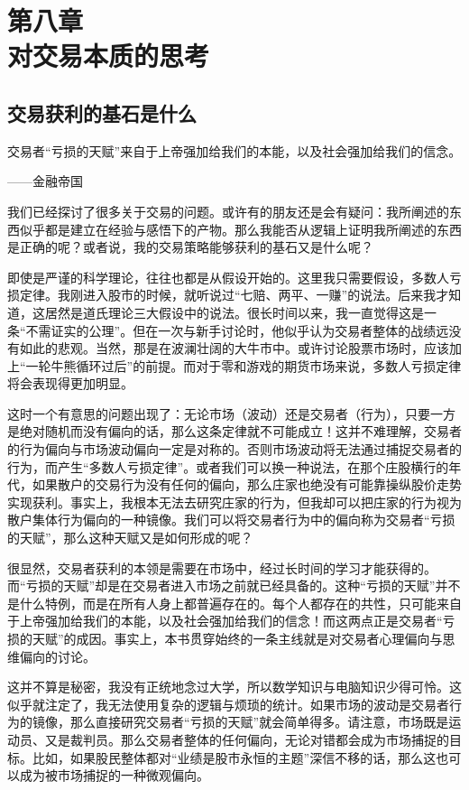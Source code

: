 \section[第八章\q 对交易本质的思考]{第八章\\ 对交易本质的思考}

\subsection{交易获利的基石是什么}

{\kaishu
交易者“亏损的天赋”来自于上帝强加给我们的本能，以及社会强加给我们的信念。

\hfill ——金融帝国
}

我们已经探讨了很多关于交易的问题。或许有的朋友还是会有疑问：我所阐述的东西似乎都是建立在经验与感悟下的产物。那么我能否从逻辑上证明我所阐述的东西是正确的呢？或者说，我的交易策略能够获利的基石又是什么呢？

即使是严谨的科学理论，往往也都是从假设开始的。这里我只需要假设，多数人亏损定律。我刚进入股市的时候，就听说过“七赔、两平、一赚”的说法。后来我才知道，这居然是道氏理论三大假设中的说法。很长时间以来，我一直觉得这是一条“不需证实的公理”。但在一次与新手讨论时，他似乎认为交易者整体的战绩远没有如此的悲观。当然，那是在波澜壮阔的大牛市中。或许讨论股票市场时，应该加上“一轮牛熊循环过后”的前提。而对于零和游戏的期货市场来说，多数人亏损定律将会表现得更加明显。

这时一个有意思的问题出现了：无论市场（波动）还是交易者（行为），只要一方是绝对随机而没有偏向的话，那么这条定律就不可能成立！这并不难理解，交易者的行为偏向与市场波动偏向一定是对称的。否则市场波动将无法通过捕捉交易者的行为，而产生“多数人亏损定律”。或者我们可以换一种说法，在那个庄股横行的年代，如果散户的交易行为没有任何的偏向，那么庄家也绝没有可能靠操纵股价走势实现获利。事实上，我根本无法去研究庄家的行为，但我却可以把庄家的行为视为散户集体行为偏向的一种镜像。我们可以将交易者行为中的偏向称为交易者“亏损的天赋”，那么这种天赋又是如何形成的呢？

很显然，交易者获利的本领是需要在市场中，经过长时间的学习才能获得的。而“亏损的天赋”却是在交易者进入市场之前就已经具备的。这种“亏损的天赋”并不是什么特例，而是在所有人身上都普遍存在的。每个人都存在的共性，只可能来自于上帝强加给我们的本能，以及社会强加给我们的信念！而这两点正是交易者“亏损的天赋”的成因。事实上，本书贯穿始终的一条主线就是对交易者心理偏向与思维偏向的讨论。

这并不算是秘密，我没有正统地念过大学，所以数学知识与电脑知识少得可怜。这似乎就注定了，我无法使用复杂的逻辑与烦琐的统计。如果市场的波动是交易者行为的镜像，那么直接研究交易者“亏损的天赋”就会简单得多。请注意，市场既是运动员、又是裁判员。那么交易者整体的任何偏向，无论对错都会成为市场捕捉的目标。比如，如果股民整体都对“业绩是股市永恒的主题”深信不移的话，那么这也可以成为被市场捕捉的一种微观偏向。

